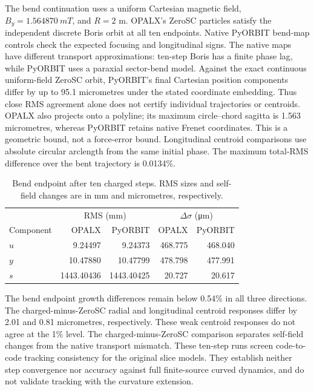 \begin{samepage}
The bend continuation uses a uniform Cartesian magnetic field,
$B_y=\SI{1.564870}{mT}$, and $R=2$ m. OPALX's ZeroSC particles satisfy
the independent discrete Boris orbit at all ten endpoints. Native PyORBIT
bend-map controls check the expected focusing and longitudinal signs.
The native maps have different transport approximations: ten-step Boris
has a finite phase lag, while PyORBIT uses a paraxial sector-bend model.
Against the exact continuous uniform-field ZeroSC orbit, PyORBIT's final
Cartesian position components differ by up to 95.1 micrometres under the stated
coordinate embedding. Thus close RMS agreement alone does not certify
individual trajectories or centroids.
OPALX also projects onto a polyline; its maximum circle--chord sagitta is
1.563 micrometres, whereas PyORBIT retains native Frenet coordinates.
This is a geometric bound, not a force-error bound. Longitudinal centroid
comparisons use absolute circular arclength from the same initial phase.
The maximum total-RMS difference over the bent trajectory is 0.0134\%. 
\par\end{samepage}
\begin{table}[H]\centering\small
\caption{Bend endpoint after ten charged steps. RMS sizes and self-field
changes are in mm and micrometres, respectively.}\begin{tabular}{lrrrr}\toprule
 &\multicolumn{2}{c}{RMS (mm)}&\multicolumn{2}{c}{$\Delta\sigma$ (\si{\micro m})}\\
 Component&OPALX&PyORBIT&OPALX&PyORBIT\\\midrule
$u$&9.24497&9.24373&468.775&468.040\\
$y$&10.47880&10.47799&478.798&477.991\\
$s$&1443.40436&1443.40425&20.727&20.617\\
\bottomrule\end{tabular}\label{tab:tracking-bend}\end{table}
\begin{samepage}
The bend endpoint growth differences remain below 0.54\% in all three directions. The charged-minus-ZeroSC radial and longitudinal centroid responses differ by 2.01 and 0.81 micrometres, respectively. These weak centroid responses do not agree at the 1\% level. The charged-minus-ZeroSC comparison separates self-field changes from the native transport mismatch. These ten-step runs screen code-to-code tracking consistency for the original slice models. They establish neither step convergence nor accuracy against full finite-source curved dynamics, and do not validate tracking with the curvature extension.
\par\end{samepage}
